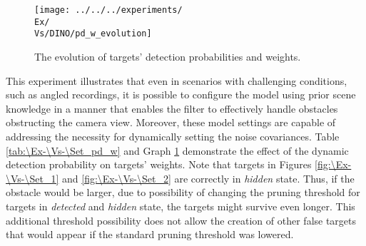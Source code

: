 \begin{figure}[H]
    \centering
    \texttt{[image: ../../../experiments/\\Ex/\\Vs/DINO/pd\_w\_evolution]}
    \caption{The evolution of targets' detection probabilities and weights.}
    \label{gr:\Ex-\Vs-\Set}
\end{figure}

This experiment illustrates that even in scenarios with challenging conditions, such as angled recordings, it is
possible to configure the model using prior scene knowledge in a manner that enables the filter to effectively handle
obstacles obstructing the camera view.
Moreover, these model settings are capable of addressing the necessity for dynamically setting the noise covariances.
Table \ref{tab:\Ex-\Vs-\Set_pd_w} and Graph \ref{gr:\Ex-\Vs-\Set} demonstrate the effect of the dynamic detection probability
on targets' weights.
Note that targets
in Figures \ref{fig:\Ex-\Vs-\Set_1} and \ref{fig:\Ex-\Vs-\Set_2} are correctly in \textit{hidden} state. Thus, if the
obstacle would be larger, due to possibility of changing the pruning threshold for targets in \textit{detected} and \textit{hidden} state, the targets might survive even longer. This additional threshold possibility does not allow the creation of other false targets that would appear if the standard pruning threshold was lowered.